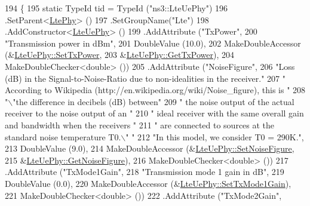 \begin{DoxyCode}
194 \{
195   \textcolor{keyword}{static} TypeId tid = TypeId (\textcolor{stringliteral}{"ns3::LteUePhy"})
196     .SetParent<\hyperlink{classns3_1_1LtePhy_a14ba34ce91bb83a5eebb4690e0c2cfbf}{LtePhy}> ()
197     .SetGroupName(\textcolor{stringliteral}{"Lte"})
198     .AddConstructor<\hyperlink{classns3_1_1LteUePhy_a9de35ef78a3d373935b5e1fe6286feb3}{LteUePhy}> ()
199     .AddAttribute (\textcolor{stringliteral}{"TxPower"},
200                    \textcolor{stringliteral}{"Transmission power in dBm"},
201                    DoubleValue (10.0),
202                    MakeDoubleAccessor (&\hyperlink{classns3_1_1LteUePhy_ae3dc19cc90247e3ab5baaa0e32a8b794}{LteUePhy::SetTxPower}, 
203                                        &\hyperlink{classns3_1_1LteUePhy_a632bc541f02345b3df0791c74f055ff8}{LteUePhy::GetTxPower}),
204                    MakeDoubleChecker<double> ())
205     .AddAttribute (\textcolor{stringliteral}{"NoiseFigure"},
206                    \textcolor{stringliteral}{"Loss (dB) in the Signal-to-Noise-Ratio due to non-idealities in the receiver."}
207                    \textcolor{stringliteral}{" According to Wikipedia (http://en.wikipedia.org/wiki/Noise\_figure), this is "}
208                    \textcolor{stringliteral}{"\(\backslash\)"the difference in decibels (dB) between"}
209                    \textcolor{stringliteral}{" the noise output of the actual receiver to the noise output of an "}
210                    \textcolor{stringliteral}{" ideal receiver with the same overall gain and bandwidth when the receivers "}
211                    \textcolor{stringliteral}{" are connected to sources at the standard noise temperature T0.\(\backslash\)" "}
212                    \textcolor{stringliteral}{"In this model, we consider T0 = 290K."},
213                    DoubleValue (9.0),
214                    MakeDoubleAccessor (&\hyperlink{classns3_1_1LteUePhy_aab1ca9ca90125fc66665cefe31adea40}{LteUePhy::SetNoiseFigure}, 
215                                        &\hyperlink{classns3_1_1LteUePhy_acccb4100bfdfa2a660eecc438817a094}{LteUePhy::GetNoiseFigure}),
216                    MakeDoubleChecker<double> ())
217     .AddAttribute (\textcolor{stringliteral}{"TxMode1Gain"},
218                    \textcolor{stringliteral}{"Transmission mode 1 gain in dB"},
219                    DoubleValue (0.0),
220                    MakeDoubleAccessor (&\hyperlink{classns3_1_1LteUePhy_a0106f6900d62a557cbb005880dcf3eab}{LteUePhy::SetTxMode1Gain}),
221                    MakeDoubleChecker<double> ())
222     .AddAttribute (\textcolor{stringliteral}{"TxMode2Gain"},

\end{DoxyCode}
